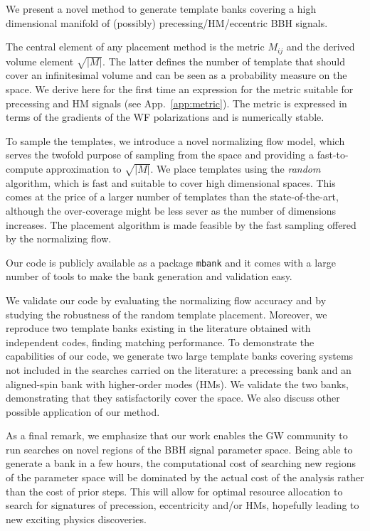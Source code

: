 \documentclass[twocolumn,showpacs,preprintnumbers,nofootinbib,prd,
superscriptaddress,10pt]{revtex4-2}
\begin{document}
We present a novel method to generate template banks covering a high dimensional manifold of (possibly) precessing/HM/eccentric BBH signals.

The central element of any placement method is the metric $M_{ij}$ and the derived volume element $\sqrt{|M|}$. The latter defines the number of template that should cover an infinitesimal volume and can be seen as a probability measure on the space.
We derive here for the first time an expression for the metric suitable for precessing and HM signals (see App.~\ref{app:metric}). The metric is expressed in terms of the gradients of the WF polarizations and is numerically stable.

To sample the templates, we introduce a novel normalizing flow model, which serves the twofold purpose of sampling from the space and providing a fast-to-compute approximation to $\sqrt{|M|}$.
We place templates using the {\it random} algorithm, which is fast and suitable to cover high dimensional spaces. This comes at the price of a larger number of templates than the state-of-the-art, although the over-coverage might be less sever as the number of dimensions increases.
The placement algorithm is made feasible by the fast sampling offered by the normalizing flow.

Our code is publicly available as a package \texttt{mbank} and it comes with a large number of tools to make the bank generation and validation easy.

We validate our code by evaluating the normalizing flow accuracy and by studying the robustness of the random template placement.
Moreover, we reproduce two template banks existing in the literature obtained with independent codes, finding matching performance.
To demonstrate the capabilities of our code, we generate two large template banks covering systems not included in the searches carried on the literature: a precessing bank and an aligned-spin bank with higher-order modes (HMs). We validate the two banks, demonstrating that they satisfactorily cover the space.
We also discuss other possible application of our method.

As a final remark, we emphasize that our work enables the GW community to run searches on novel regions of the BBH signal parameter space. Being able to generate a bank in a few hours, the computational cost of searching new regions of the parameter space will be dominated by the actual cost of the analysis rather than the cost of prior steps.
This will allow for optimal resource allocation to search for signatures of precession, eccentricity and/or HMs, hopefully leading to new exciting physics discoveries.
\end{document}
